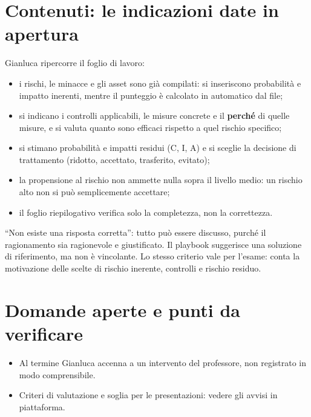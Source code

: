 \section{Contenuti: le indicazioni date in apertura}
Gianluca ripercorre il foglio di lavoro:
\begin{itemize}
  \item i rischi, le minacce e gli asset sono già compilati: si inseriscono probabilità e impatto
    inerenti, mentre il punteggio è calcolato in automatico dal file;
  \item si indicano i controlli applicabili, le misure concrete e il \textbf{perché} di quelle misure,
    e si valuta quanto sono efficaci rispetto a quel rischio specifico;
  \item si stimano probabilità e impatti residui (C, I, A) e si sceglie la decisione di trattamento
    (ridotto, accettato, trasferito, evitato);
  \item la propensione al rischio non ammette nulla sopra il livello medio: un rischio alto non si può
    semplicemente accettare;
  \item il foglio riepilogativo verifica solo la completezza, non la correttezza.
\end{itemize}

\begin{esame}
``Non esiste una risposta corretta'': tutto può essere discusso, purché il ragionamento sia ragionevole e
giustificato. Il playbook suggerisce una soluzione di riferimento, ma non è vincolante. Lo stesso criterio
vale per l'esame: conta la motivazione delle scelte di rischio inerente, controlli e rischio residuo.
\end{esame}

\section{Domande aperte e punti da verificare}
\begin{verifica}
\begin{itemize}
  \item Al termine Gianluca accenna a un intervento del professore, non registrato in modo comprensibile.
  \item Criteri di valutazione e soglia per le presentazioni: vedere gli avvisi in piattaforma.
\end{itemize}
\end{verifica}
